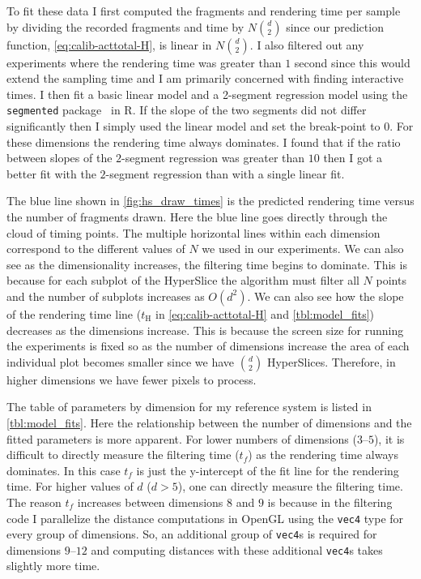 To fit these data I first computed the fragments and rendering time per 
sample by dividing the recorded fragments and time by $N {d \choose 2}$
since our prediction function, \autoref{eq:calib-acttotal-H}, is linear in $N {d
\choose 2}$.  I also filtered out any experiments where the rendering time was
greater than $1$ second since this would extend the sampling time and I
am primarily concerned with finding interactive times.  I then fit a basic 
linear model and a 2-segment
regression model using the \texttt{segmented} package~\cite{Muggeo:2008} in R.
If the slope of the two segments did not differ significantly then I simply
used the linear model and set the break-point to $0$.  For these dimensions
the rendering time always dominates.  I found that if the ratio between slopes
of the $2$-segment regression was greater than $10$ then I got a better fit
with the $2$-segment regression than with a single linear fit.

The blue line shown in \autoref{fig:hs_draw_times} is the predicted rendering time
versus the number of fragments drawn.  Here the blue line goes directly through
the cloud of timing points.  The multiple horizontal lines within each dimension
correspond to the different values of $N$ we used in our experiments.
We can also see as the dimensionality increases,
the filtering time begins to dominate.  This is because for each subplot of the
HyperSlice the algorithm must filter all $N$ points and the number of subplots increases
as $O(d^2)$.  We can also see how the slope of the rendering time line
($t_\text{H}$ in \autoref{eq:calib-acttotal-H} and \autoref{tbl:model_fits}) decreases as
the dimensions increase. This is because the screen size for running the
experiments is fixed so as the number of dimensions increase the area of each
individual plot becomes smaller since we have $d \choose 2$ HyperSlices.
Therefore, in higher dimensions we have fewer pixels to process. 

The table of parameters by dimension for my reference system is
listed in \autoref{tbl:model_fits}. Here the relationship
between the number of dimensions and the fitted parameters is more apparent.
For lower numbers of dimensions ($3$--$5$), it is difficult to directly measure
the filtering time ($t_f$) as the rendering time always dominates. In this
case $t_f$ is just the y-intercept of the fit line for the rendering time.
For higher values of $d$ ($d>5$), one can directly measure the filtering time.
The reason $t_f$ increases between dimensions $8$ and $9$ is because in the
filtering code I parallelize the distance computations in OpenGL using the
\texttt{vec4} type for every group of dimensions. So, an additional group
of \texttt{vec4}s is required for dimensions $9$--$12$ and computing distances with these additional \texttt{vec4}s takes slightly more time.

